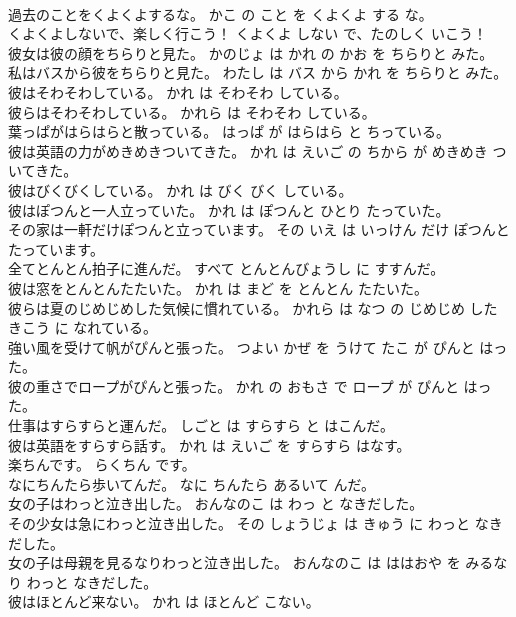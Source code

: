 \documentclass[8pt]{extreport}
\begin{document}
\begin{CJK}{UTF8}{min}
\\	過去のことをくよくよするな。	かこ の こと を くよくよ する な。	
\\	くよくよしないで、楽しく行こう！	くよくよ しない で、たのしく いこう！	
\\	彼女は彼の顔をちらりと見た。	かのじょ は かれ の かお を ちらりと みた。	
\\	私はバスから彼をちらりと見た。	わたし は バス から かれ を ちらりと みた。	
\\	彼はそわそわしている。	かれ は そわそわ している。	
\\	彼らはそわそわしている。	かれら は そわそわ している。	
\\	葉っぱがはらはらと散っている。	はっぱ が はらはら と ちっている。	
\\	彼は英語の力がめきめきついてきた。	かれ は えいご の ちから が めきめき ついてきた。	
\\	彼はびくびくしている。	かれ は びく びく している。	
\\	彼はぽつんと一人立っていた。	かれ は ぽつんと ひとり たっていた。	
\\	その家は一軒だけぽつんと立っています。	その いえ は いっけん だけ ぽつんと たっています。	
\\	全てとんとん拍子に進んだ。	すべて とんとんびょうし に すすんだ。	
\\	彼は窓をとんとんたたいた。	かれ は まど を とんとん たたいた。	
\\	彼らは夏のじめじめした気候に慣れている。	かれら は なつ の じめじめ した きこう に なれている。	
\\	強い風を受けて帆がぴんと張った。	つよい かぜ を うけて たこ が ぴんと はった。	
\\	彼の重さでロープがぴんと張った。	かれ の おもさ で ロープ が ぴんと はった。	
\\	仕事はすらすらと運んだ。	しごと は すらすら と はこんだ。	
\\	彼は英語をすらすら話す。	かれ は えいご を すらすら はなす。	
\\	楽ちんです。	らくちん です。	
\\	なにちんたら歩いてんだ。	なに ちんたら あるいて んだ。	
\\	女の子はわっと泣き出した。	おんなのこ は わっ と なきだした。	
\\	その少女は急にわっと泣き出した。	その しょうじょ は きゅう に わっと なきだした。	
\\	女の子は母親を見るなりわっと泣き出した。	おんなのこ は ははおや を みるなり わっと なきだした。	
\\	彼はほとんど来ない。	かれ は ほとんど こない。	

\end{CJK}
\end{document}

